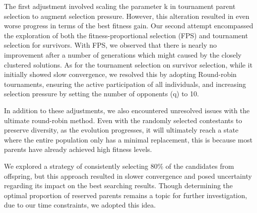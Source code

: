 The first adjustment involved scaling the parameter k in tournament parent selection to augment selection pressure. However, this alteration resulted in even worse progress in terms of the best fitness gain. Our second attempt encompassed the exploration of both the fitness-proportional selection (FPS) and tournament selection for survivors. With FPS, we observed that there is nearly no improvement after a number of generations which might caused by the closely clustered solutions. As for the tournament selection on survivor selection, while it initially showed slow convergence, we resolved this by adopting Round-robin tournaments, ensuring the active participation of all individuals, and increasing selection pressure by setting the number of opponents (q) to 10.

In addition to these adjustments, we also encountered unresolved issues with the ultimate round-robin method. Even with the randomly selected contestants to preserve diversity, as the evolution progresses, it will ultimately reach a state where the entire population only has a minimal replacement, this is because most parents have already achieved high fitness levels. 

We explored a strategy of consistently selecting 80\% of the candidates from offspring, but this approach resulted in slower convergence and posed uncertainty regarding its impact on the best searching results. 
Though determining the optimal proportion of reserved parents remains a topic for further investigation, due to our time constraints, we adopted this idea.




